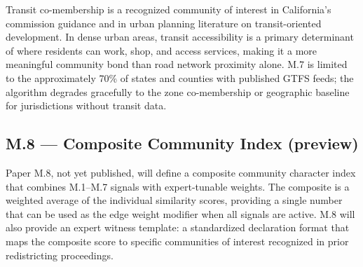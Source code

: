 Transit co-membership is a recognized community of interest in California's commission
guidance and in urban planning literature on transit-oriented development.
In dense urban areas, transit accessibility is a primary determinant of where
residents can work, shop, and access services, making it a more meaningful community
bond than road network proximity alone.
M.7 is limited to the approximately 70\% of states and counties with published GTFS
feeds; the algorithm degrades gracefully to the zone co-membership or geographic
baseline for jurisdictions without transit data.

\subsection{M.8 --- Composite Community Index (preview)}

Paper M.8, not yet published, will define a composite community character index
that combines M.1--M.7 signals with expert-tunable weights.
The composite is a weighted average of the individual similarity scores,
providing a single number that can be used as the edge weight modifier when all
signals are active.
M.8 will also provide an expert witness template: a standardized declaration format
that maps the composite score to specific communities of interest recognized in
prior redistricting proceedings.

